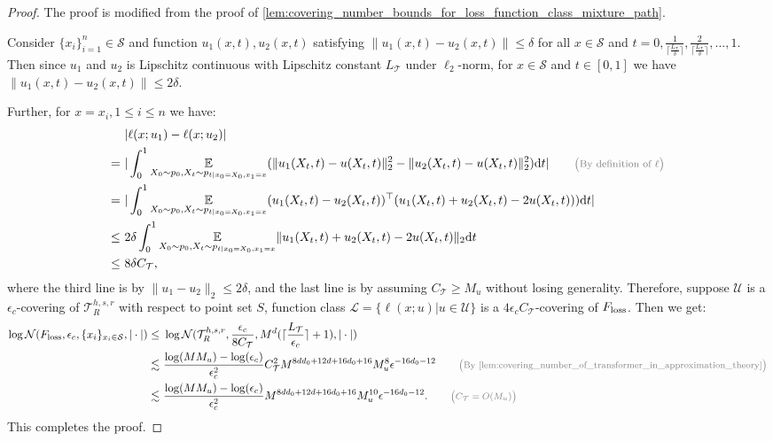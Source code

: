 \documentclass[12pt]{article}
\numberwithin{equation}{section}
\DeclareMathOperator*{\E}{{\mathbb{E}}}
\def\E{\mathbb{E}}
\theoremstyle{theoremstyle}
\numberwithin{equation}{section}
\numberwithin{theorem}{section}
\numberwithin{proposition}{section}
\numberwithin{definition}{section}
\numberwithin{lemma}{section}
\numberwithin{assumption}{section}
\numberwithin{remark}{section}
\newcommand*{\annot}[1]{\tag*{\footnotesize{\textcolor{black!50}{\big(#1\big)}}}}
\begin{document}
\begin{proof}
The proof is modified from the proof of \cref{lem:covering_number_bounds_for_loss_function_class_mixture_path}.

Consider $\{x_i\}_{i=1}^n\in \mathcal{S}$ and function $u_1(x,t),u_2(x,t)$ satisfying $\|u_1(x,t)-u_2(x,t)\|\leq \delta$ for all $x\in \mathcal{S}$ and $t=0,\frac{1}{\lceil\frac{L_\mathcal{T}}{\delta}\rceil},\frac{2}{\lceil\frac{L_\mathcal{T}}{\delta}\rceil},\dots,1$.
Then since $u_1$ and $u_2$ is Lipschitz continuous with Lipschitz constant $L_{\mathcal{T}}$ under $\ell_2$-norm, for $x\in \mathcal{S}$ and $t\in[0,1]$ we have $\|u_1(x,t)-u_2(x,t)\|\leq 2\delta$.

Further, for $x=x_i,1\leq i\leq n$ we have: 
\begin{align*}
    & ~|\ell(x;u_1)-\ell(x;u_2)| \\
    = & ~
    |\int_0^1 \underset{X_0\sim p_0,X_t\sim p_{t|x_0=X_0,x_1=x}}{\E}(\|u_1(X_t,t)-u(X_t,t)\|_2^2- 
    \|u_2(X_t,t)-u(X_t,t)\|_2^2) \dd t| \annot{By definition of $\ell$}\\
    = & ~
    |\int_0^1 \underset{X_0\sim p_0,X_t\sim p_{t|x_0=X_0,x_1=x}}{\E}(u_1(X_t,t)-u_2(X_t,t))^\top(u_1(X_t,t)+u_2(X_t,t)-2u(X_t,t))) \dd t|\\
    \leq & ~
    2\delta \int_0^1 \underset{X_0\sim p_0,X_t\sim p_{t|x_0=X_0,x_1=x}}{\E}\|u_1(X_t,t)+u_2(X_t,t)-2u(X_t,t)\|_2 \dd t \\
    \leq & ~
    8\delta C_\mathcal{T},            
\end{align*}
where the third line is by $\|u_1-u_2\|_2\leq2\delta$, and the last line is by assuming $C_\mathcal{T}\geq M_u$ without losing generality.
Therefore, suppose $\mathcal{U}$ is a $\epsilon_c$-covering of $\mathcal{T}^{h,s,r}_R$ with respect to point set $S$, function class $\mathcal{L}=\{\ell(x;u)|u\in\mathcal{U}\}$ is a $4\epsilon_cC_\mathcal{T}$-covering of $F_{\rm loss}$.
Then we get:
\begin{align*}
    \log\mathcal{N}(F_{\rm loss},\epsilon_c,\{x_i\}_{x_i\in \mathcal{S}},|\cdot|)\leq & ~
    \log\mathcal{N}(\mathcal{T}^{h,s,r}_R,\frac{\epsilon_c}{8C_\mathcal{T}},M^d(\lceil\frac{L_\mathcal{T}}{\epsilon_c}\rceil+1),|\cdot|) \\
    \lesssim & ~
    \frac{\log(MM_u)-\log(\epsilon_c)}{\epsilon_c^2}C_\mathcal{T}^2M^{8dd_0+12d+16d_0+16}M_u^8\epsilon^{-16d_0-12} \annot{By \cref{lem:covering_number_of_transformer_in_approximation_theory}} \\
    \lesssim & ~
    \frac{\log(MM_u)-\log(\epsilon_c)}{\epsilon_c^2}M^{8dd_0+12d+16d_0+16}M_u^{10}\epsilon^{-16d_0-12}. \annot{$C_\mathcal{T}=O(M_u)$}
\end{align*}
This completes the proof.
\end{proof}
\end{document}
